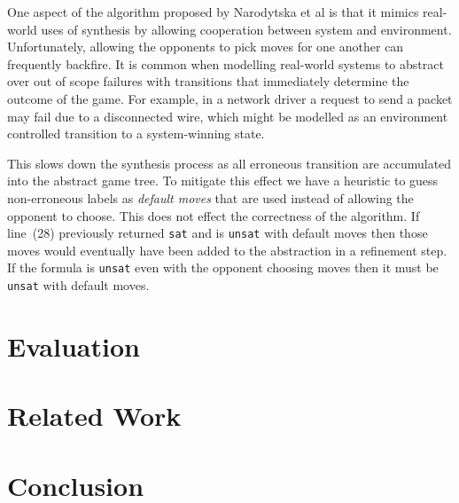 \documentclass{llncs}
\begin{document}
One aspect of the algorithm proposed by Narodytska et al\cite{narodytska2014}
is that it mimics real-world uses of synthesis by allowing cooperation between
system and environment. Unfortunately, allowing the opponents to pick moves for
one another can frequently backfire. It is common when modelling real-world
systems to abstract over out of scope failures with transitions that
immediately determine the outcome of the game. For example, in a network driver
a request to send a packet may fail due to a disconnected wire, which might be
modelled as an environment controlled transition to a system-winning state.

This slows down the synthesis process as all erroneous transition are
accumulated into the abstract game tree. To mitigate this effect we have a
heuristic to guess non-erroneous labels as \emph{default moves} that are used
instead of allowing the opponent to choose. This does not effect the
correctness of the algorithm. If line~(28) previously returned \texttt{sat} and
is \texttt{unsat} with default moves then those moves would eventually have
been added to the abstraction in a refinement step. If the formula is
\texttt{unsat} even with the opponent choosing moves then it must be
\texttt{unsat} with default moves.

\section{Evaluation}

\section{Related Work}

\section{Conclusion}




\end{document}
